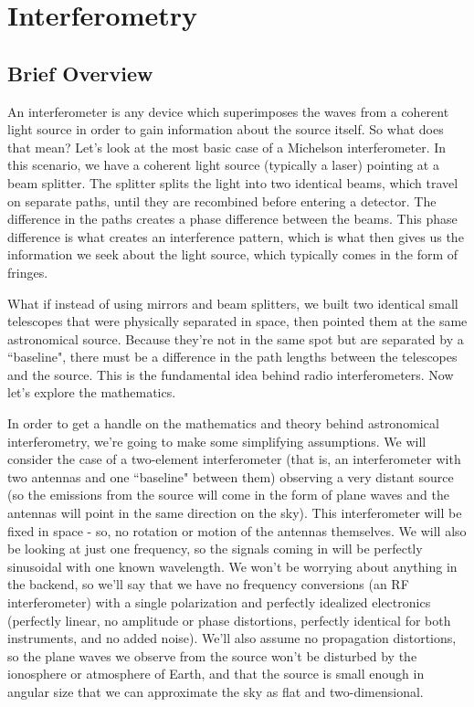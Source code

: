 \chapter{Interferometry}
\label{chap:interferometry}

\section{Brief Overview}
\label{sec:brief-overview}

An interferometer is any device which superimposes the waves from a coherent 
light source in order to gain information about the source itself. So what does 
that mean? Let's look at the most basic case of a Michelson interferometer. In 
this scenario, we have a coherent light source (typically a laser) pointing at 
a beam splitter. The splitter splits the light into two identical beams, which 
travel on separate paths, until they are recombined before entering a detector. 
The difference in the paths creates a phase difference between the beams. This 
phase difference is what creates an interference pattern, which is what then 
gives us the information we seek about the light source, which typically comes 
in the form of fringes. 

What if instead of using mirrors and beam splitters, we built two identical 
small telescopes that were physically separated in space, then pointed them at 
the same astronomical source. Because they're not in the same spot but are 
separated by a ``baseline", there must be a difference in the path lengths 
between the telescopes and the source. This is the fundamental idea behind 
radio interferometers. Now let's explore the mathematics.

In order to get a handle on the mathematics and theory behind astronomical 
interferometry, we're going to make some simplifying assumptions. We will 
consider the case of a two-element interferometer (that is, an interferometer 
with two antennas and one ``baseline" between them) observing a very distant 
source (so the emissions from the source will come in the form of plane waves 
and the antennas will point in the same direction on the sky).  This 
interferometer will be fixed in space - so, no rotation or motion of the 
antennas themselves.  We will also be looking at just one frequency, so the 
signals coming in will be perfectly sinusoidal with one known wavelength.  We 
won't be worrying about anything in the backend, so we'll say that we have no 
frequency conversions (an RF interferometer) with a single polarization and 
perfectly idealized electronics (perfectly linear, no amplitude or phase 
distortions, perfectly identical for both instruments, and no added noise).  
We'll also assume no propagation distortions, so the plane waves we observe 
from the source won't be disturbed by the ionosphere or atmosphere of Earth, 
and that the source is small enough in angular size that we can approximate the 
sky as flat and two-dimensional. 

